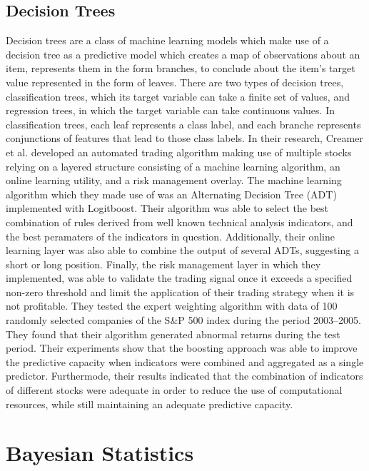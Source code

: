 \subsection{Decision Trees}

Decision trees are a class of machine learning models which make use of a decision tree as a predictive model which creates a map of observations about an item, represents them in the form branches, to conclude about the item's target value represented in the form of leaves. There are two types of decision trees, classification trees, which its target variable can take a finite set of values, and regression trees, in which the target variable can take continuous values. In classification trees, each leaf represents a class label, and each branche represents conjunctions of features that lead to those class labels. In their research, Creamer et al. developed an automated trading algorithm making use of multiple stocks relying on a layered structure consisting of a machine learning algorithm, an online learning utility, and a risk management overlay.\cite{Creamer:2010aa} The machine learning algorithm which they made use of was an Alternating Decision Tree (ADT) implemented with Logitboost. Their algorithm was able to select the best combination of rules derived from well known technical analysis indicators, and the best peramaters of the indicators in question. Additionally, their online learning layer was also able to combine the output of several ADTs, suggesting a short or long position. Finally, the risk management layer in which they implemented, was able to validate the trading signal once it exceeds a specified non-zero threshold and limit the application of their trading strategy when it is not profitable. They tested the expert weighting algorithm with data of 100 randomly selected companies of the S\&P 500 index during the period 2003–2005. They found that their algorithm generated abnormal returns during the test period. Their experiments show that the boosting approach was able to improve the predictive capacity when indicators were combined and aggregated as a single predictor. Furthermode, their results indicated that the combination of indicators of different stocks were adequate in order to reduce the use of computational resources, while still maintaining an adequate predictive capacity.

\section{Bayesian Statistics}

